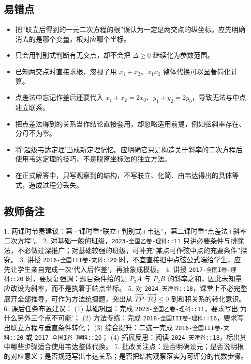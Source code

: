 \documentclass[UTF8,a4paper,11pt]{ctexart}
\begin{document}
\subsection*{易错点}

\begin{itemize}

\item 把“联立后得到的一元二次方程的根”误认为一定是两交点的纵坐标。应先明确消去的是哪个变量，根对应哪个坐标。

\item 只会用判别式判断有无交点，却不会把 $\Delta\ge 0$ 继续化为参数范围。

\item 已知两交点时直接求根，忽视了用 \(x_1+x_2\)、\(x_1x_2\) 整体代换可以显著简化计算。

\item 点差法中忘记作差后还要代入 \(x_1+x_2=2x_0\)、\(y_1+y_2=2y_0\)，导致无法与中点建立联系。

\item 把点差法得到的关系当作结论直接套用，却忽略适用前提，例如弦斜率存在、分母不为零。

\item 将‘超级韦达定理’当成新定理记忆。应明确它只是构造关于斜率的二次方程后使用韦达定理的技巧，不是脱离坐标法的独立方法。

\item 在正式解答中，只写观察到的结构，不写联立、化简、由韦达得出的具体等式，造成过程分丢失。

\end{itemize}

\subsection*{教师备注}

1. 两课时节奏建议：第一课时重“联立+判别式+韦达”，第二课时重“点差法+斜率二次方程”。
2. 对基础一般的班级，\texttt{2023-全国乙卷-理科::11} 只讲必要条件与排除法，不必做过深推广；对基础较强的班级，可补充“某点可作弦中点的充要条件”探究。
3. 讲授 \texttt{2016-全国III卷-文科::20} 时，不宜直接把中点弦公式端给学生，应先让学生亲自完成一次‘代入后作差’，再抽象成模板。
4. 讲授 \texttt{2017-全国I卷-理科::20} 时，要反复强调：题目条件给的是 \(P_2A\) 与 \(P_2B\) 的斜率之和，因此未知量应改设为斜率，而不是执着于端点坐标。
5. 对 \texttt{2024-天津卷::18}，课堂上不必完整展开全部推导，可作为方法统摄题，突出从 \(\overrightarrow{TP}\cdot\overrightarrow{TQ}\le 0\) 到和积关系的转化意识。
6. 课后任务布置建议：
   (1) 基础巩固：完成 \texttt{2023-全国乙卷-理科::11}，要求写出‘为什么另外三个点不可能’；
   (2) 方法专练：完成 \texttt{2018-全国III卷-理科::16}，要求写出联立方程与垂直条件转化；
   (3) 综合提升：二选一完成 \texttt{2016-全国III卷-文科::20} 或 \texttt{2017-全国I卷-理科::20}；
   (4) 拓展反思：阅读 \texttt{2024-天津卷::18}，标出其中哪些步骤适合使用韦达整体代换。
7. 批改关注点：是否明确设元；是否说明根的对应意义；是否规范写出韦达关系；是否把结构观察落实为可评分的代数步骤。
\end{document}
